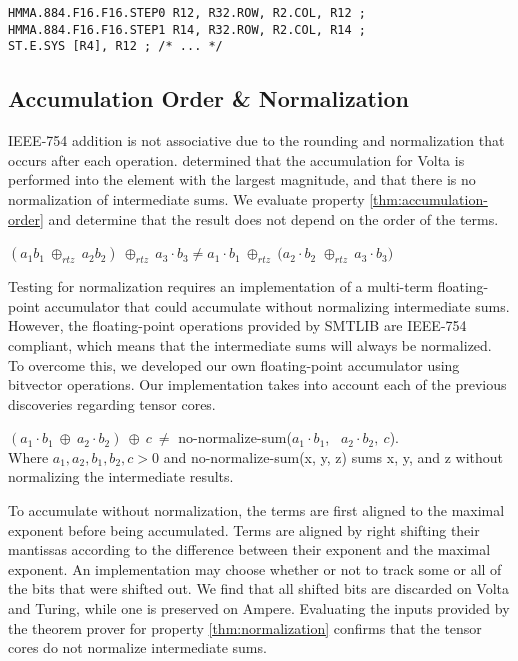 \begin{lstlisting}[label={lst:hmma-disasm},caption={The SASS disassembly (Volta) for half-precision mma. Only the first store is shown.},basicstyle=\ttfamily\footnotesize,captionpos=b,float,frame=single,breaklines=true]
HMMA.884.F16.F16.STEP0 R12, R32.ROW, R2.COL, R12 ;
HMMA.884.F16.F16.STEP1 R14, R32.ROW, R2.COL, R14 ;
ST.E.SYS [R4], R12 ; /* ... */
\end{lstlisting}


\subsection{Accumulation Order \& Normalization}
IEEE-754 addition is not associative due to the rounding and normalization that occurs after each operation. \citet{fasi2021numerical} determined that the accumulation for Volta is performed into the element with the largest magnitude, and that there is no normalization of intermediate sums. We evaluate property \ref{thm:accumulation-order} and determine that the result does not depend on the order of the terms. 

\begin{myprop}\label{thm:accumulation-order}
    $(a_1 b_1~\oplus_{rtz}~a_2  b_2 )~\oplus_{rtz}~a_3\cdot b_3 \neq a_1 \cdot b_1~\oplus_{rtz}~(a_2 \cdot b_2 $
    $\oplus_{rtz}~a_3\cdot b_3)$
\end{myprop}

Testing for normalization requires an implementation of a multi-term floating-point accumulator that could accumulate without normalizing intermediate sums. However, the floating-point operations provided by SMTLIB are IEEE-754 compliant, which means that the intermediate sums will always be normalized. To overcome this, we developed our own floating-point accumulator using bitvector operations.  Our implementation takes into account each of the previous discoveries regarding tensor cores.

\begin{myprop}\label{thm:normalization}
$(a_1\cdot b_1~\oplus~a_2\cdot b_2)~\oplus~c~\neq$
no-normalize-sum($a_1\cdot b_1$, ~$a_2\cdot b_2,~c$).\\
Where $a_1,a_2,b_1,b_2, c > 0$ and no-normalize-sum(x, y, z) sums x, y, and z without normalizing the intermediate results.
\end{myprop}

To accumulate without normalization, the terms are first aligned to the maximal exponent before being accumulated. Terms are aligned by right shifting their mantissas according to the difference between their exponent and the maximal exponent. An implementation may choose whether or not to track some or all of the bits that were shifted out. We find that all shifted bits are discarded on Volta and Turing, while one is preserved on Ampere.  Evaluating the inputs provided by the theorem prover for property \ref{thm:normalization} confirms that the tensor cores do not normalize intermediate sums. 
